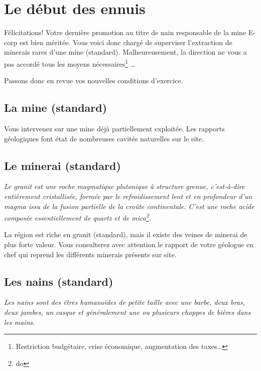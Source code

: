 
\newpage

\section{Le début des ennuis}

  Félicitations! Votre dernière promotion au titre de nain responsable de la
  mine E-corp est bien méritée. Vous voici donc chargé de superviser
  l'extraction de minerais rares d'une mine (standard). Malheureusement, la
  direction ne vous a pas accordé tous les moyens nécessaires\footnote{
  Restriction budgétaire, crise économique, augmentation des taxes\ldots{}}
  \ldots{}

  Passons donc en revue vos nouvelles conditions d'exercice.

\subsection{La mine (standard)}

  Vous intervenez sur une mine déjà partiellement exploitée. Les rapports
  géologiques font état de nombreuses cavités naturelles sur le site.

\subsection{Le minerai (standard)}

  \textit{Le granit est une roche magmatique plutonique à structure grenue,
  c'est-à-dire entièrement cristallisée, formée par le refroidissement lent et
  en profondeur d'un magma issu de la fusion partielle de la croûte
  continentale.  C'est une roche acide composée essentiellement de quartz et de
  mica\footnote{do}.}

  La région est riche en granit (standard), mais il existe des veines de
  minerai de plus forte valeur. Vous consulterez avec attention le rapport de
  votre géologue en chef qui reprend les différents minerais présents sur site.

\subsection{Les nains (standard)}

  \textit{Les nains sont des êtres humanoïdes de petite taille avec une barbe,
  deux bras, deux jambes, un casque et généralement une ou plusieurs choppes de
  bières dans les mains.}


